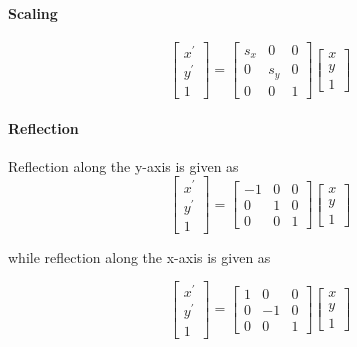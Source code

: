\paragraph{Scaling}

\begin{equation}
	\left[\begin{array}{l}{x^{\prime}} \\ {y^{\prime}} \\ {1}\end{array}\right]=\left[\begin{array}{lll}{s_{x}} & {0} & {0} \\ {0} & {s_{y}} & {0} \\ {0} & {0} & {1}\end{array}\right]\left[\begin{array}{l}{x} \\ {y} \\ {1}\end{array}\right]
\end{equation}


\paragraph{Reflection}
Reflection along the y-axis is given as
\begin{equation}
	\left[\begin{array}{l}{x^{\prime}} \\ {y^{\prime}} \\ {1}\end{array}\right]=\left[\begin{array}{rll}{-1} & {0} & {0} \\ {0} & {1} & {0} \\ {0} & {0} & {1}\end{array}\right]\left[\begin{array}{l}{x} \\ {y} \\ {1}\end{array}\right]
\end{equation}

while reflection along the x-axis is given as

\begin{equation}
	\left[\begin{array}{l}{x^{\prime}} \\ {y^{\prime}} \\ {1}\end{array}\right]=\left[\begin{array}{rrr}{1} & {0} & {0} \\ {0} & {-1} & {0} \\ {0} & {0} & {1}\end{array}\right]\left[\begin{array}{l}{x} \\ {y} \\ {1}\end{array}\right]
\end{equation}

